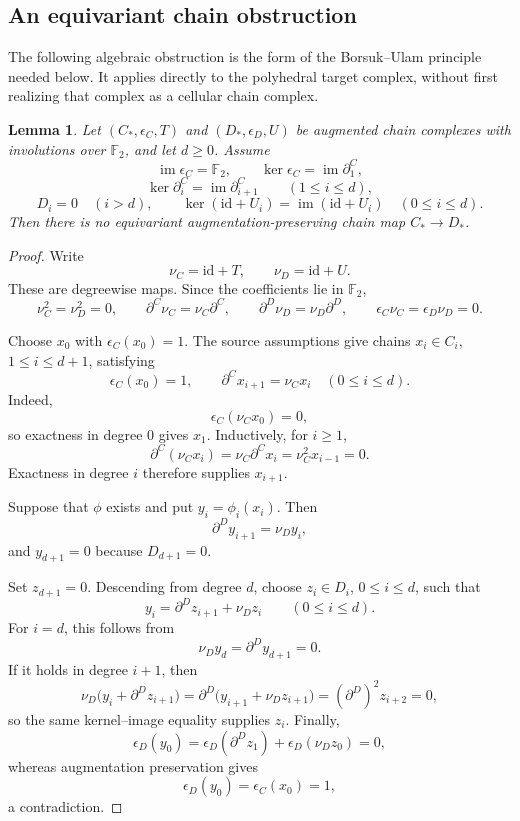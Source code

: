 \documentclass[reqno,12pt]{amsart}
\newtheorem{lemma}[theorem]{Lemma}
\theoremstyle{definition}
\newcommand{\F}{\mathbb F_2}
\newcommand{\id}{\mathrm{id}}
\begin{document}
\subsection{An equivariant chain obstruction}

The following algebraic obstruction is the form of the
Borsuk--Ulam principle needed below.  It applies directly to the
polyhedral target complex, without first realizing that complex as a
cellular chain complex.

\begin{lemma}\label{lem:dold-chain}
Let \((C_*,\epsilon_C,T)\) and \((D_*,\epsilon_D,U)\) be augmented
chain complexes with involutions over \(\F\), and let \(d\geq0\).
Assume
\[
 \operatorname{im}\epsilon_C=\F,\qquad
 \ker\epsilon_C=\operatorname{im}\partial_1^C,
\]
\[
 \ker\partial_i^C=\operatorname{im}\partial_{i+1}^C
 \qquad(1\leq i\leq d),
\]
\[
 D_i=0\quad(i>d),
 \qquad
 \ker(\id+U_i)=\operatorname{im}(\id+U_i)\quad(0\leq i\leq d).
\]
Then there is no equivariant augmentation-preserving chain map
\(C_*\to D_*\).
\end{lemma}

\begin{proof}
Write
\[
 \nu_C=\id+T,\qquad
 \nu_D=\id+U.
\]
These are degreewise maps. Since the coefficients lie in \(\F\),
\[
 \nu_C^2=\nu_D^2=0,\qquad
 \partial^C\nu_C=\nu_C\partial^C,\qquad
 \partial^D\nu_D=\nu_D\partial^D,\qquad
 \epsilon_C\nu_C=\epsilon_D\nu_D=0.
\]

Choose \(x_0\) with \(\epsilon_C(x_0)=1\). The source assumptions
give chains \(x_i\in C_i\), \(1\le i\le d+1\), satisfying
\[
 \epsilon_C(x_0)=1,\qquad
 \partial^C x_{i+1}=\nu_Cx_i
 \quad(0\le i\le d).
\]
Indeed,
\[
 \epsilon_C(\nu_Cx_0)=0,
\]
so exactness in degree \(0\) gives \(x_1\). Inductively, for
\(i\ge1\),
\[
 \partial^C(\nu_Cx_i)
 =\nu_C\partial^C x_i
 =\nu_C^2x_{i-1}
 =0.
\]
Exactness in degree \(i\) therefore supplies \(x_{i+1}\).

Suppose that \(\phi\) exists and put $y_i=\phi_i(x_i)$. Then
\[
 \partial^D y_{i+1}=\nu_Dy_i,
\]
and $y_{d+1}=0$ because \(D_{d+1}=0\).

Set \(z_{d+1}=0\). Descending from degree \(d\), choose
\(z_i\in D_i\), \(0\le i\le d\), such that
\[
 y_i=\partial^D z_{i+1}+\nu_Dz_i
 \qquad(0\le i\le d).
\]
For \(i=d\), this follows from
\[
 \nu_Dy_d=\partial^D y_{d+1}=0.
\]
If it holds in degree \(i+1\), then
\[
 \nu_D\bigl(y_i+\partial^Dz_{i+1}\bigr)
 =\partial^D\bigl(y_{i+1}+\nu_Dz_{i+1}\bigr)
 =(\partial^D)^2z_{i+2}
 =0,
\]
so the same kernel--image equality supplies \(z_i\). Finally,
\[
 \epsilon_D(y_0)
 =\epsilon_D(\partial^Dz_1)
 +\epsilon_D(\nu_Dz_0)
 =0,
\]
whereas augmentation preservation gives
\[
 \epsilon_D(y_0)
 =\epsilon_C(x_0)
 =1,
\]
a contradiction.
\end{proof}
\end{document}

